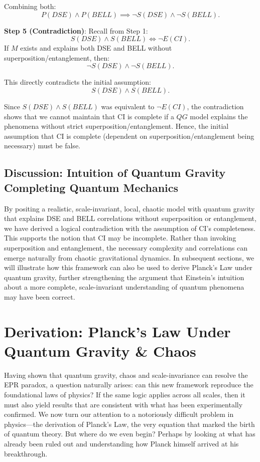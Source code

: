 \documentclass{article}
\begin{document}
Combining both:
\[
P(DSE) \wedge P(BELL) \implies \neg S(DSE) \wedge \neg S(BELL).
\]

\textbf{Step 5 (Contradiction)}:
Recall from Step 1:
\[
S(DSE) \wedge S(BELL) \iff \neg E(CI).
\]
If $M$ exists and explains both DSE and BELL without superposition/entanglement, then:
\[
\neg S(DSE) \wedge \neg S(BELL).
\]

This directly contradicts the initial assumption:
\[
S(DSE) \wedge S(BELL).
\]

Since $S(DSE) \wedge S(BELL)$ was equivalent to $\neg E(CI)$, the contradiction shows that we cannot maintain that CI is complete if a $QG$ model explains the phenomena without strict superposition/entanglement. Hence, the initial assumption that CI is complete (dependent on superposition/entanglement being necessary) must be false.

\subsection*{Discussion: Intuition of Quantum Gravity Completing Quantum Mechanics}

By positing a realistic, scale-invariant, local, chaotic model with quantum gravity that explains DSE and BELL correlations without superposition or entanglement, we have derived a logical contradiction with the assumption of CI's completeness. This supports the notion that CI may be incomplete. Rather than invoking superposition and entanglement, the necessary complexity and correlations can emerge naturally from chaotic gravitational dynamics. In subsequent sections, we will illustrate how this framework can also be used to derive Planck’s Law under quantum gravity, further strengthening the argument that Einstein’s intuition about a more complete, scale-invariant understanding of quantum phenomena may have been correct.

\section*{Derivation: Planck's Law Under Quantum Gravity \& Chaos}
Having shown that quantum gravity, chaos and scale-invariance can resolve the EPR paradox, a question naturally arises: can this new framework reproduce the foundational laws of physics? If the same logic applies across all scales, then it must also yield results that are consistent with what has been experimentally confirmed. We now turn our attention to a notoriously difficult problem in physics—the derivation of Planck's Law, the very equation that marked the birth of quantum theory. But where do we even begin? Perhaps by looking at what has already been ruled out and understanding how Planck himself arrived at his breakthrough.
\end{document}

